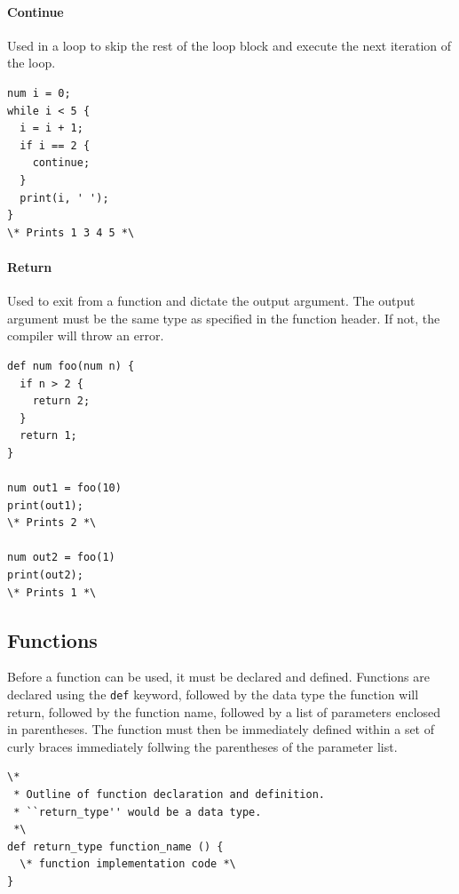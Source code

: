 \documentclass{article}
\newcommand{\code}[1]{\texttt{#1}} %
\begin{document}
\paragraph{Continue}
Used in a loop to skip the rest of the loop block and execute the next iteration of the loop.

\begin{lstlisting}[language=pltLang, label=lst:continue-statement]
num i = 0;
while i < 5 {
  i = i + 1;
  if i == 2 {
    continue;
  }
  print(i, ' ');
}
\* Prints 1 3 4 5 *\

\end{lstlisting}

\paragraph{Return}
Used to exit from a function and dictate the output argument. The output argument must be the same type as specified in the function header. If not, the compiler will throw an error.

\begin{lstlisting}[language=pltLang, label=lst:return-statement]
def num foo(num n) {
  if n > 2 {
    return 2;
  }
  return 1;
} 

num out1 = foo(10)
print(out1);
\* Prints 2 *\

num out2 = foo(1)
print(out2);
\* Prints 1 *\
\end{lstlisting}


\subsection{Functions}


Before a function can be used, it must be declared and defined. Functions are declared using the \code{def} keyword, followed by the data type the function will return, followed by the function name, followed by a list of parameters enclosed in parentheses. The function must then be immediately defined within a set of curly braces immediately follwing the parentheses of the parameter list. 

\begin{lstlisting}[language=pltLang, caption=Function declaration and definition., label=lst:funct-def]
\* 
 * Outline of function declaration and definition.
 * ``return_type'' would be a data type.
 *\
def return_type function_name () {
  \* function implementation code *\
}
\end{lstlisting}
\end{document}
